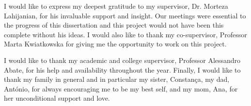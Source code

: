 \begin{acknowledgements}
I would like to express my deepest gratitude to my supervisor, Dr. Morteza Lahijanian, for his invaluable support and insight. Our meetings were essential to the progress of this dissertation and this project would not have been this complete without his ideas. I would also like to thank my co-supervisor, Professor Marta Kwiatkowska for giving me the opportunity to work on this project. 

I would like to thank my academic and college supervisor, Professor Alessandro Abate, for his help and availability throughout the year. Finally, I would like to thank my family in general and in particular my sister, Constança, my dad, António, for always encouraging me to be my best self, and my mom, Ana, for her unconditional support and love.
\end{acknowledgements}